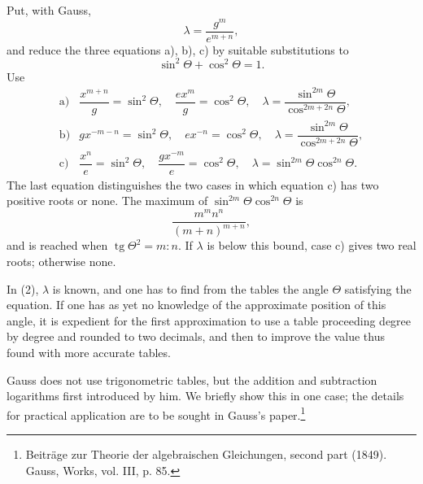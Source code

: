 \documentclass[11pt]{article}
\providecommand{\tg}{\operatorname{tg}}
\begin{document}
Put, with Gauss,
\[
        \lambda=\frac{g^m}{e^{m+n}},
\]
and reduce the three equations a), b), c) by suitable substitutions to
\[
        \sin^2\Theta+\cos^2\Theta=1.
\]
Use
\begin{equation}
\begin{array}{ll}
\mathrm{a)}&
\dfrac{x^{m+n}}g=\sin^2\Theta,\quad
\dfrac{ex^m}{g}=\cos^2\Theta,\quad
\lambda=\dfrac{\sin^{2m}\Theta}{\cos^{2m+2n}\Theta},\\[1.0em]
\mathrm{b)}&
gx^{-m-n}=\sin^2\Theta,\quad
ex^{-n}=\cos^2\Theta,\quad
\lambda=\dfrac{\sin^{2m}\Theta}{\cos^{2m+2n}\Theta},\\[1.0em]
\mathrm{c)}&
\dfrac{x^n}{e}=\sin^2\Theta,\quad
\dfrac{gx^{-m}}{e}=\cos^2\Theta,\quad
\lambda=\sin^{2m}\Theta\cos^{2n}\Theta.
\end{array}
\tag{2}
\end{equation}
The last equation distinguishes the two cases in which equation c) has two positive roots or none. The maximum of $\sin^{2m}\Theta\cos^{2n}\Theta$ is
\[
        \frac{m^mn^n}{(m+n)^{m+n}},
\]
and is reached when $\tg\Theta^2=m:n$. If $\lambda$ is below this bound, case c) gives two real roots; otherwise none.

In (2), $\lambda$ is known, and one has to find from the tables the angle $\Theta$ satisfying the equation. If one has as yet no knowledge of the approximate position of this angle, it is expedient for the first approximation to use a table proceeding degree by degree and rounded to two decimals, and then to improve the value thus found with more accurate tables.

Gauss does not use trigonometric tables, but the addition and subtraction logarithms first introduced by him. We briefly show this in one case; the details for practical application are to be sought in Gauss's paper.\footnote{Beiträge zur Theorie der algebraischen Gleichungen, second part (1849). Gauss, Works, vol. III, p. 85.}
\end{document}
